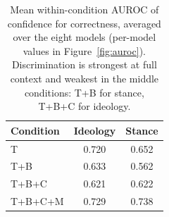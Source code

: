 \documentclass[11pt]{article}
\begin{document}
\begin{table}[h]
\centering
\small
\setlength{\tabcolsep}{3.6pt}
\begin{tabular}{lcc}
\toprule
Condition & Ideology & Stance \\
\midrule
T        & 0.720 & 0.652 \\
T+B      & 0.633 & 0.562 \\
T+B+C    & 0.621 & 0.622 \\
T+B+C+M  & 0.729 & 0.738 \\
\bottomrule
\end{tabular}
\caption{Mean within-condition AUROC of confidence for correctness, averaged over the eight models (per-model values in Figure~\ref{fig:auroc}). Discrimination is strongest at full context and weakest in the middle conditions: T+B for stance, T+B+C for ideology.}
\label{tab:auroc}
\end{table}
\end{document}
